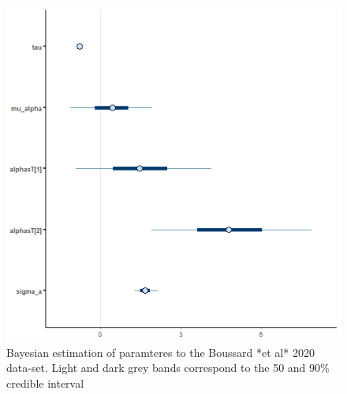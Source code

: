 \documentclass[
]{article}
\begin{document}
\begin{figure}

\includegraphics[width=6.67in,]{images/boussard_mcmc_interv} \hfill{}

\caption{Bayesian estimation of paramteres to the Boussard *et al* 2020 data-set. Light and dark grey bands correspond to the 50 and 90\% credible interval}\label{fig:boussard_interv}
\end{figure}
\end{document}
